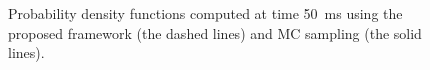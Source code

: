 \begin{figure}[b]
  \centering
  \vspace{-1.5em}
  \vspace{-2.0em}
  \caption{Probability density functions computed at time 50~ms using the proposed framework (the dashed lines) and MC sampling (the solid lines).}
\end{figure}
